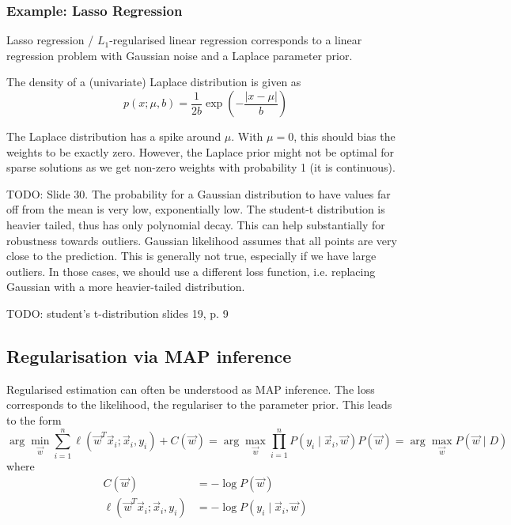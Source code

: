 \subsubsection{Example: Lasso Regression}
Lasso regression / $L_1$-regularised linear regression
corresponds to a linear regression problem with Gaussian
noise and a Laplace parameter prior.

The density of a (univariate) Laplace distribution is given as
\begin{equation*}
    p(x; \mu, b) = \frac{1}{2b} \exp{\left(
        -\frac{|x - \mu|}{b}
    \right)}
\end{equation*}

The Laplace distribution has a spike around $\mu$.
With $\mu = 0$, this should bias the weights to be exactly zero.
However, the Laplace prior might not be optimal
for sparse solutions as we get non-zero weights
with probability 1 (it is continuous).

TODO: Slide 30.
The probability for a Gaussian distribution to have values far off from the mean is very low,
exponentially low.
The student-t distribution is heavier tailed, thus has only polynomial decay.
This can help substantially for robustness towards outliers.
Gaussian likelihood assumes that all points are very close to the prediction.
This is generally not true, especially if we have large outliers.
In those cases, we should use a different loss function,
i.e. replacing Gaussian with a more heavier-tailed distribution.

TODO: student's t-distribution slides 19, p. 9

\subsection{Regularisation via MAP inference}
Regularised estimation can often be understood as MAP inference.
The loss corresponds to the likelihood,
the regulariser to the parameter prior.
This leads to the form
\begin{equation*}
    \arg\min_{\vec{w}}{
        \sum_{i=1}^n{\ell(\vec{w}^T \vec{x}_i; \vec{x}_i, y_i)}
        + C(\vec{w})
    }
    = \arg\max_{\vec{w}}{
        \prod_{i=1}^n{P(y_i \mid \vec{x}_i, \vec{w})} P(\vec{w})
    }
    = \arg\max_{\vec{w}}{P(\vec{w} \mid D)}
\end{equation*}
where
\begin{align*}
    C(\vec{w}) &= - \log{P(\vec{w})} \\
    \ell(\vec{w}^T \vec{x}_i; \vec{x}_i, y_i)
        &= -\log{P(y_i \mid \vec{x}_i, \vec{w})}
\end{align*}


